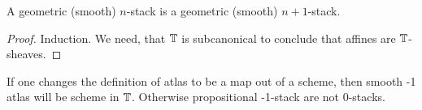 \documentclass{article}
\newcommand{\red}[1]{{\color{red} #1}}
\begin{document}
\begin{lemma}{\label{lemma:succStab}}
    A geometric (smooth) $n$-stack is a geometric (smooth) $n+1$-stack.
\end{lemma}

\begin{proof}
    Induction. 
    We need, that $\mathbb{T}$ is subcanonical to conclude that affines are $\mathbb{T}$-sheaves.
\end{proof}
\begin{rmk}
    If one changes the definition of atlas to be a map out of a scheme, then smooth -1 atlas will be scheme in $\mathbb{T}$. Otherwise propositional -1-stack are not 0-stacks.
\end{rmk}
\end{document}

